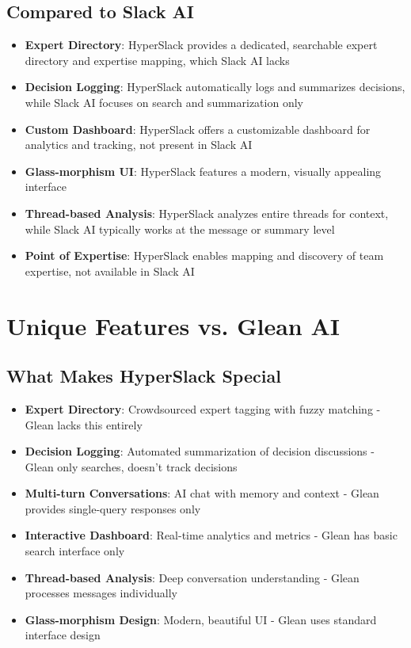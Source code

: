 \documentclass[12pt,a4paper]{article}
\begin{document}
\subsection{Compared to Slack AI}
\begin{itemize}
    \item \textbf{Expert Directory}: HyperSlack provides a dedicated, searchable expert directory and expertise mapping, which Slack AI lacks
    \item \textbf{Decision Logging}: HyperSlack automatically logs and summarizes decisions, while Slack AI focuses on search and summarization only
    \item \textbf{Custom Dashboard}: HyperSlack offers a customizable dashboard for analytics and tracking, not present in Slack AI
    \item \textbf{Glass-morphism UI}: HyperSlack features a modern, visually appealing interface
    \item \textbf{Thread-based Analysis}: HyperSlack analyzes entire threads for context, while Slack AI typically works at the message or summary level
    \item \textbf{Point of Expertise}: HyperSlack enables mapping and discovery of team expertise, not available in Slack AI
\end{itemize}

\section{Unique Features vs. Glean AI}
\subsection{What Makes HyperSlack Special}
\begin{itemize}
    \item \textbf{Expert Directory}: Crowdsourced expert tagging with fuzzy matching - Glean lacks this entirely
    \item \textbf{Decision Logging}: Automated summarization of decision discussions - Glean only searches, doesn't track decisions
    \item \textbf{Multi-turn Conversations}: AI chat with memory and context - Glean provides single-query responses only
    \item \textbf{Interactive Dashboard}: Real-time analytics and metrics - Glean has basic search interface only
    \item \textbf{Thread-based Analysis}: Deep conversation understanding - Glean processes messages individually
    \item \textbf{Glass-morphism Design}: Modern, beautiful UI - Glean uses standard interface design
\end{itemize}
\end{document}
